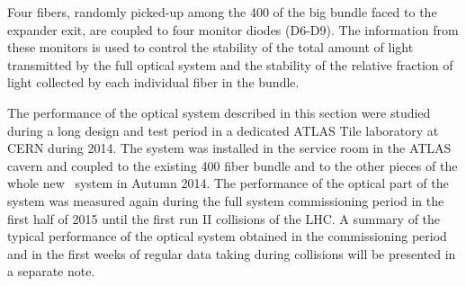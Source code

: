Four fibers, randomly picked-up among the 400 of the big bundle faced to the
expander exit, are coupled to four monitor diodes (D6-D9). The information from
these monitors is used to control the stability of the total amount of light
transmitted by the full optical system and the stability of the relative fraction of
light collected by each individual fiber in the bundle.

The performance of the optical system described in this section were studied during
a long design and test period in a dedicated ATLAS Tile laboratory at CERN during 2014. The system was installed in the service room in the
ATLAS cavern and coupled to the existing 400 fiber bundle and to the other pieces of
the whole new \lasii~system in Autumn 2014. The performance of the optical
part of the system was measured again during the full system commissioning period
in the first half of 2015 until the first run II collisions of the LHC. A summary of
the typical performance of the optical system obtained in the commissioning period
and in the first weeks of regular data taking during collisions will be presented in a separate note.

